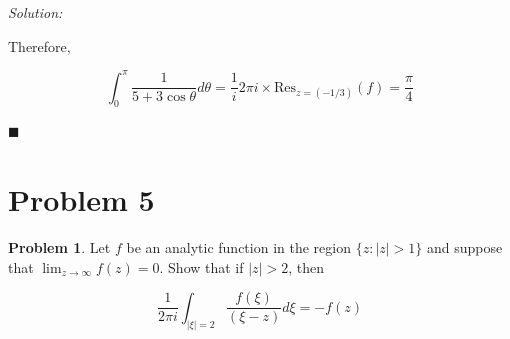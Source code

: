 \documentclass[12pt]{article}
\newcommand{\res}{\text{Res}}
\theoremstyle{definition}
\newtheorem*{prb}{Problem}
\newenvironment{problem}{
\begin{tcolorbox}[colback=blue!5!white,colframe=blue!75!black, parbox = true] \begin{prb}  }{\end{prb}\end{tcolorbox} }
\newenvironment{answer}{\textit{Solution: }\quad }{ \hfill $\blacksquare$}
\numberwithin{equation}{section}
\begin{document}
\begin{answer}
\begin{enumerate}
		Therefore,

		$$
		\int_{0}^{\pi} \dfrac{1}{5 + 3\cos \theta} d\theta = \dfrac{1}{i} 2\pi i \times \res_{z = (-1/3)}(f) = \dfrac{\pi}{4}
		$$

	\end{enumerate}
\end{answer}

\pagebreak

\section{Problem 5}
\begin{problem}
	Let $f$ be an analytic function in the region $\{ z : |z| > 1\}$ and suppose that $\lim_{z \rightarrow \infty} f(z) = 0$. Show that if $|z| > 2$, then 

	$$
	\dfrac{1}{2\pi i} \int_{|\xi| = 2} \dfrac{f(\xi)}{(\xi - z)}d\xi = -f(z)
	$$
\end{problem}
\end{document}
